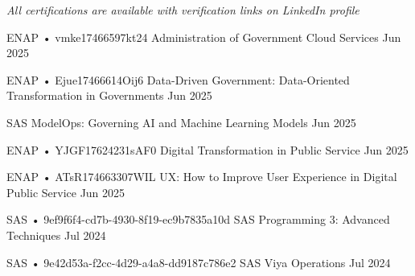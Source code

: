 
\textit{ \small All certifications are available with verification links on LinkedIn profile}


\begin{cventries}

  \cventry
    {ENAP • vmke17466597kt24} %
    {Administration of Government Cloud Services} %
    {} %
    {Jun 2025} %
    {}

  \cventry
    {ENAP • Ejue17466614Oij6} %
    {Data-Driven Government: Data-Oriented Transformation in Governments} %
    {} %
    {Jun 2025} %
    {}

  \cventry
    {SAS} %
    {ModelOps: Governing AI and Machine Learning Models} %
    {} %
    {Jun 2025} %
    {}

  \cventry
    {ENAP • YJGF17624231sAF0} %
    {Digital Transformation in Public Service} %
    {} %
    {Jun 2025} %
    {}

  \cventry
    {ENAP • ATsR174663307WIL} %
    {UX: How to Improve User Experience in Digital Public Service} %
    {} %
    {Jun 2025} %
    {}

  \cventry
    {SAS • 9ef9f6f4-cd7b-4930-8f19-ec9b7835a10d} %
    {SAS Programming 3: Advanced Techniques} %
    {} %
    {Jul 2024} %
    {}

  \cventry
    {SAS • 9e42d53a-f2cc-4d29-a4a8-dd9187c786e2} %
    {SAS Viya Operations} %
    {} %
    {Jul 2024} %
    {}


\end{cventries}

